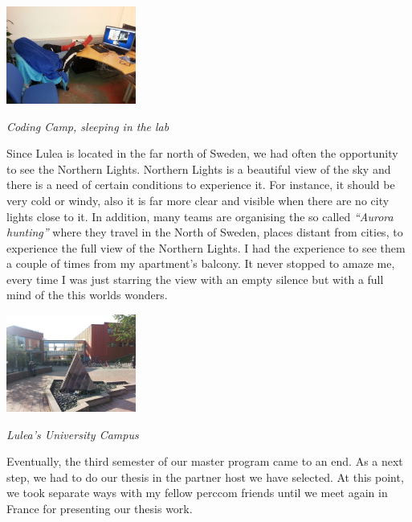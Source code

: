 \documentclass[10pt,a4paper]{article} %
\begin{document}
\begin{multicols}{3}
\begin{center}
	\includegraphics[width=0.32\textwidth]{media/coding_camp.jpg}
	\par\textit{Coding Camp, sleeping in the lab}
\end{center}
  

Since Lulea is located in the far north of Sweden, we had often the opportunity to 
see the Northern Lights. 
Northern Lights is a beautiful view of the sky and there is a need of certain 
conditions to experience it. 
For instance, it should be very cold or windy, also it is far more clear and visible 
when there are no city lights close to it. 
In addition, many teams are organising the so called \textit{``Aurora hunting''} 
where they travel in the North of Sweden, places distant from cities, to experience 
the full view of the Northern Lights. 
I had the experience to see them a couple of times from my apartment's balcony. 
It never stopped to amaze me, every time I was just starring the view with an empty 
silence but with a full mind of the this worlds wonders.
 


\begin{center}
	\includegraphics[width=0.32\textwidth]{media/campus_lulea.jpg}
	\par\textit{Lulea's University Campus}
\end{center}


Eventually, the third semester of our master program came to an end. 
As a next step, we had to do our thesis in the partner host we have selected. 
At this point, we took separate ways with my fellow {\sc perccom} friends 
until we meet again in France for presenting our thesis work. 





\end{multicols}
\end{document}
